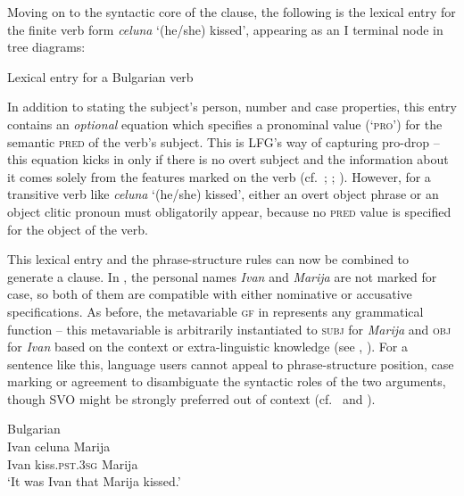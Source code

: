 \documentclass[output=paper,hidelinks]{langscibook}
\begin{document}
Moving on to the syntactic core of the clause, the following is the lexical entry for the finite verb form \textit{celuna} `(he/she) kissed', appearing as an I terminal node in tree diagrams: 

\ea\label{ex:Slavic:16} Lexical entry for a Bulgarian verb\\[1ex]
\z

In addition to stating the subject's person, number and case properties, this entry contains an \textit{optional} equation which specifies a pronominal value (`\textsc{pro'}) for the semantic \textsc{pred} of the verb's subject. This is LFG's way of capturing pro-drop -- this equation kicks in only if there is no overt subject and the information about it comes solely from the features marked on the verb (cf.\ ; \citealt[59, 358, 440]{BresnanEtAl2016}; ). However, for a transitive verb like \textit{celuna} `(he/she) kissed', either an overt object phrase or an object clitic pronoun must obligatorily appear, because no \textsc{pred} value is specified for the object of the verb. 

This lexical entry and the phrase-structure rules can now be combined to generate a clause. In , the personal names \textit{Ivan} and \textit{Marija} are not marked for case, so both of them are compatible with either nominative or accusative specifications. As before, the metavariable \textsc{gf} in  represents any grammatical function -- this metavariable is arbitrarily instantiated to \textsc{subj} for \textit{Marija} and \textsc{obj} for \textit{Ivan} based on the context or extra-linguistic knowledge (see \citealt[esp.\ 15--16]{Rudin1985}, \citealt[134, 136]{dalrymple01}). For a sentence like this, language users cannot appeal to phrase-structure position, case marking or agreement to disambiguate the syntactic roles of the two arguments, though SVO might be strongly preferred out of context (cf.\  and ).

\ea Bulgarian\\%
    \label{ex:Slavic:17}
    \gll Ivan   celuna     Marija\\
      Ivan   kiss.\textsc{pst.3sg}   Marija \\
    \glt`It was Ivan that Marija kissed.'
    \z
\end{document}
